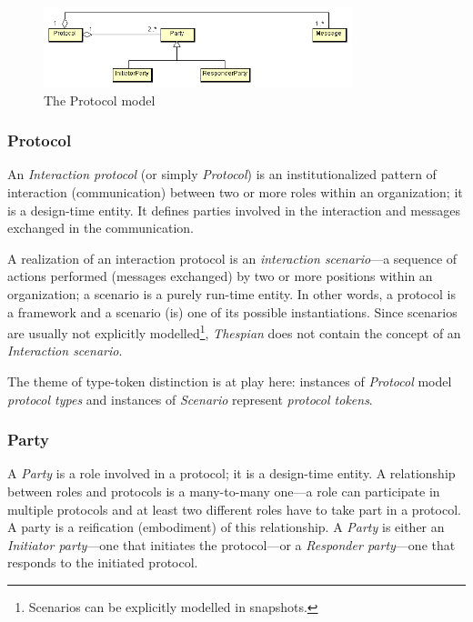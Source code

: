 \begin{figure}[ht]
	\centering
	\includegraphics[width=0.8\textwidth]{images/thespian/protocol-model.png}
	\caption{The Protocol model}
	\label{figure:thespian-protocol-model}
\end{figure}

\subsubsection*{Protocol}

An \textit{Interaction protocol} (or simply \textit{Protocol}) is an institutionalized pattern of interaction (communication) between two or more roles within an organization; it is a design-time entity.
It defines parties involved in the interaction and messages exchanged in the communication.

A realization of an interaction protocol is an \textit{interaction scenario}---a sequence of actions performed (messages exchanged) by two or more positions within an organization; a scenario is a purely run-time entity.
In other words, a protocol is a framework and a scenario (is) one of its possible instantiations.
Since scenarios are usually not explicitly modelled\footnote{Scenarios can be explicitly modelled in snapshots.}, \textit{Thespian} does not contain the concept of an \textit{Interaction scenario}.

The theme of type-token distinction is at play here: instances of \textit{Protocol} model \textit{protocol types} and instances of \textit{Scenario} represent \textit{protocol tokens}.

\subsubsection*{Party}

A \textit{Party} is a role involved in a protocol; it is a design-time entity.
A relationship between roles and protocols is a many-to-many one---a role can participate in multiple protocols and at least two different roles have to take part in a protocol.
A party is a reification (embodiment) of this relationship.
A \textit{Party} is either an \textit{Initiator party}---one that initiates the protocol---or a \textit{Responder party}---one that responds to the initiated protocol.

